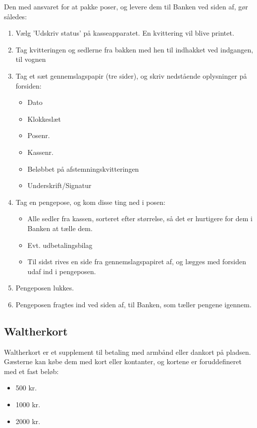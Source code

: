 Den med ansvaret for at pakke poser, og levere dem til Banken ved siden af, gør således:
\begin{enumerate}
  \item Vælg 'Udskriv status' på kasseapparatet. En kvittering vil blive printet.
  \item Tag kvitteringen og sedlerne fra bakken med hen til indhakket ved indgangen, til vognen
  \item Tag et sæt gennemslagspapir (tre sider), og skriv nedstående oplysninger på forsiden:
  \begin{itemize}
    \item Dato
    \item Klokkeslæt
    \item Posenr.
    \item Kassenr.
    \item Beløbbet på afstemningskvitteringen
    \item Underskrift/Signatur
  \end{itemize}
  \item Tag en pengepose, og kom disse ting ned i posen:
  \begin{itemize}
    \item Alle sedler fra kassen, sorteret efter størrelse, så det er hurtigere for dem i Banken at 
    tælle dem. 
    \item Evt. udbetalingsbilag
    \item Til sidst rives en side fra gennemslagspapiret af, og lægges med forsiden udaf ind i pengeposen.
  \end{itemize}
  \item Pengeposen lukkes.
  \item Pengeposen fragtes ind ved siden af, til Banken, som tæller pengene igennem.
\end{enumerate}

\subsection{Waltherkort}
Waltherkort er et supplement til betaling med armbånd eller dankort på pladsen.
Gæsterne kan købe dem med kort eller kontanter, og kortene er foruddefineret med et fast beløb:
\begin{itemize}
  \item 500 kr.
  \item 1000 kr.
  \item 2000 kr.
\end{itemize} 

